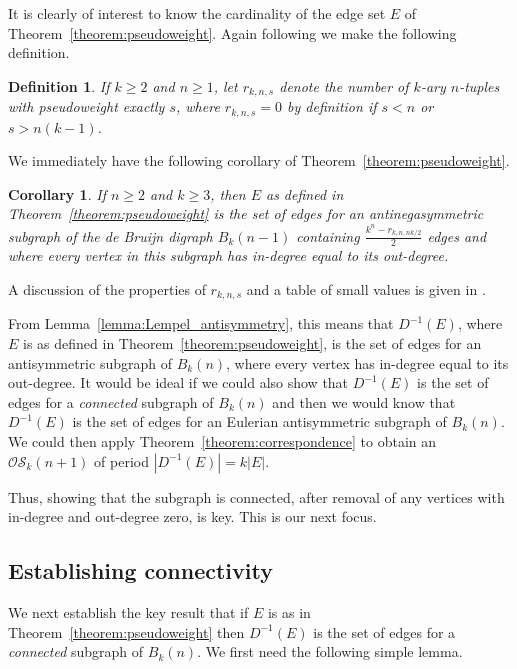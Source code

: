 \documentclass[a4paper,11pt]{article}
\newtheorem{corollary}[lemma]{Corollary}
\newtheorem{definition}[lemma]{Definition}
\begin{document}
It is clearly of interest to know the cardinality of the edge set $E$ of
Theorem~\ref{theorem:pseudoweight}.  Again following \cite{Mitchell25a} we make the following
definition.

\begin{definition}
If $k\geq2$ and $n\geq 1$, let $r_{k,n,s}$ denote the number of $k$-ary $n$-tuples with
pseudoweight exactly $s$, where $r_{k,n,s}=0$ by definition if $s<n$ or $s>n(k-1)$.
\end{definition}

We immediately have the following corollary of Theorem~\ref{theorem:pseudoweight}.

\begin{corollary}  \label{corollary:E_pseudoweight}
If $n\geq2$ and $k\geq3$, then $E$ as defined in Theorem~\ref{theorem:pseudoweight} is the set of
edges for an antinegasymmetric subgraph of the de Bruijn digraph $B_{k}(n-1)$ containing
$\frac{k^n-r_{k,n,nk/2}}{2}$ edges and where every vertex in this subgraph has in-degree equal to
its out-degree.
\end{corollary}

A discussion of the properties of $r_{k,n,s}$ and a table of small values is given in \cite[Section
3.4]{Mitchell25a}.

From Lemma~\ref{lemma:Lempel_antisymmetry}, this means that $D^{-1}(E)$, where $E$ is as defined
in
Theorem~\ref{theorem:pseudoweight}, is the set of edges for an antisymmetric subgraph of $B_k(n)$,
where every vertex has in-degree equal to its out-degree.  It would be ideal if we could also show
that $D^{-1}(E)$ is the set of edges for a \emph{connected} subgraph of $B_{k}(n)$ and then we
would know that $D^{-1}(E)$ is the set of edges for an Eulerian antisymmetric subgraph of
$B_k(n)$.
We could then apply Theorem~\ref{theorem:correspondence} to obtain an $\mathcal{OS}_k(n+1)$ of
period $|D^{-1}(E)|=k|E|$.

Thus, showing that the subgraph is connected, after removal of any vertices with in-degree and
out-degree zero, is key.  This is our next focus.

\subsection{Establishing connectivity}

We next establish the key result that if $E$ is as in Theorem~\ref{theorem:pseudoweight} then
$D^{-1}(E)$ is the set of edges for a \emph{connected} subgraph of $B_{k}(n)$.  We first need the
following simple lemma.
\end{document}
